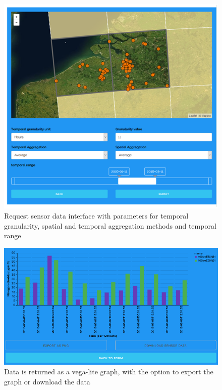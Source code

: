 \begin{figure}
	\centering
	\includegraphics[width=\linewidth]{figs/interface2.PNG}
	\caption{Request sensor data interface with parameters for temporal granularity, spatial and temporal aggregation methods and temporal range}
	\label{fig:interface3}
\end{figure}

\begin{figure}
	\centering
	\includegraphics[width=0.9\linewidth]{figs/interface4.PNG}
	\caption{Data is returned as a vega-lite graph, with the option to export the graph or download the data}
	\label{fig:interface4}
\end{figure}  
